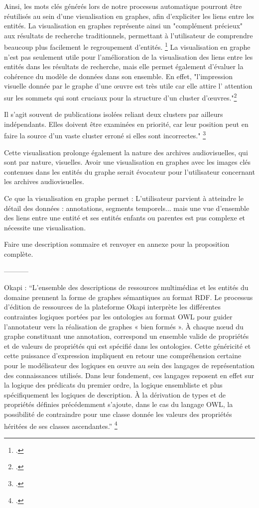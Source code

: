 Ainsi, les mots clés générés lors de notre processus automatique pourront être réutilisés au sein d'une visualisation en graphes, afin d'expliciter les liens entre les entités. La visualisation en graphes représente ainsi un "complément précieux" aux résultats de recherche traditionnels, permettant à l'utilisateur de comprendre beaucoup plus facilement le regroupement d'entités. \footcite{zotero-item-749}
La visualisation en graphe n'est pas seulement utile pour l'amélioration de la visualisation des liens entre les entités dans les résultats de recherche, mais elle permet également d'évaluer la cohérence du modèle de données dans son ensemble. En effet, "l’impression visuelle donnée par le graphe d’une œuvre est très utile car elle attire l’ attention sur les sommets qui sont cruciaux pour la structure d’un cluster d’œuvres."\footcite{zotero-item-749}

Il s’agit souvent de publications isolées reliant deux clusters par ailleurs indépendants. Elles doivent être examinées en priorité, car leur position peut en faire la source d’un vaste cluster erroné si elles sont incorrectes." \footcite{zotero-item-749}

Cette visualisation prolonge également la nature des archives audiovisuelles, qui sont par nature, visuelles. Avoir une visualisation en graphes avec les images clés contenues dans les entités du graphe serait évocateur pour l'utilisateur concernant les archives audiovisuelles. 

Ce que la visualisation en graphe permet : L'utilisateur parvient à atteindre le détail des données : annotations, segments temporels... mais une vue d'ensemble des liens entre une entité et ses entités enfants ou parentes est pus complexe et nécessite une visualisation. 

Faire une description sommaire et renvoyer en annexe pour la proposition complète. 


-----------

Okapi : “L’ensemble des descriptions de ressources multimédias et les entités du domaine prennent la forme de graphes sémantiques au format RDF. Le processus d’édition de ressources de la plateforme Okapi interprète les différentes contraintes logiques portées par les ontologies au format OWL pour guider l’annotateur vers la réalisation de graphes « bien formés ». À chaque nœud du graphe constituant une annotation, correspond un ensemble valide de propriétés et de valeurs de propriétés qui est spécifié dans les ontologies. Cette généricité et cette puissance d’expression impliquent en retour une compréhension certaine pour le modélisateur des logiques en œuvre au sein des langages de représentation des connaissances utilisés. Dans leur fondement, ces langages reposent en effet sur la logique des prédicats du premier ordre, la logique ensembliste et plus spécifiquement les logiques de description. À la dérivation de types et de propriétés définies précédemment s’ajoute, dans le cas du langage OWL, la possibilité de contraindre pour une classe donnée les valeurs des propriétés héritées de ses classes ascendantes.” \footcite{lalande2022} 

